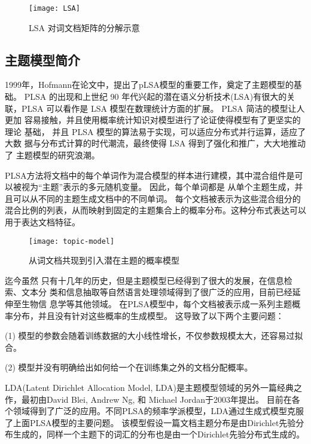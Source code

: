 \begin{figure}[htb]\centering
  \texttt{[image: LSA]}
  \caption{LSA 对词文档矩阵的分解示意}
  \label{fig:LSA}%
\end{figure}

\subsection{主题模型简介}
1999年，Hofmann在论文\cite{hofmann1999probabilistic}中，提出了pLSA模型的重要工作，奠定了主题模型的基础。
PLSA 的出现和上世纪 90 年代兴起的潜在语义分析技术(LSA)有很大的关联，PLSA 可以看作是 LSA 模型在数理统计方面的扩展。
PLSA 简洁的模型让人更加 容易接触，并且使用概率统计知识对模型进行了论证使得模型有了更坚实的理论 基础，
并且 PLSA 模型的算法易于实现，可以适应分布式并行运算，适应了大数 据与分布式计算的时代潮流，最终使得 LSA 得到了强化和推广，大大地推动了 主题模型的研究浪潮。

PLSA方法将文档中的每个单词作为混合模型的样本进行建模，其中混合组件是可以被视为“主题”表示的多元随机变量。
因此，每个单词都是 从单个主题生成，并且可以从不同的主题生成文档中的不同单词。 
每个文档被表示为这些混合组分的混合比例的列表，从而映射到固定的主题集合上的概率分布。这种分布式表达可以用于表达文档特征。

\begin{figure}[htb]\centering
  \texttt{[image: topic-model]}
  \caption{从词文档共现到引入潜在主题的概率模型}
  \label{fig:topic-model}%
\end{figure}

迄今虽然 只有十几年的历史，但是主题模型已经得到了很大的发展，在信息检索、文本分 类和信息抽取等自然语言处理领域得到了很广泛的应用，目前已经延伸至生物信 息学等其他领域。
在PLSA模型中，每个文档被表示成一系列主题概率分布，并且没有针对这些概率的生成模型。
这导致了以下两个主要问题：

(1) 模型的参数会随着训练数据的大小线性增长，不仅参数规模太大，还容易过拟合。

(2) 模型并没有明确给出如何给一个在训练集之外的文档分配概率。

LDA(Latent Dirichlet Allocation Model, LDA)\cite{blei2003latent}是主题模型领域的另外一篇经典之作，最初由David Blei, Andrew Ng, 和 Michael Jordan于2003年提出。
目前在各个领域得到了广泛的应用。不同PLSA的频率学派模型，LDA通过生成式模型克服了上面PLSA模型的主要问题。
该模型假设一篇文档主题分布是由Dirichlet先验分布生成的，同样一个主题下的词汇的分布也是由一个Dirichlet先验分布式生成的。

